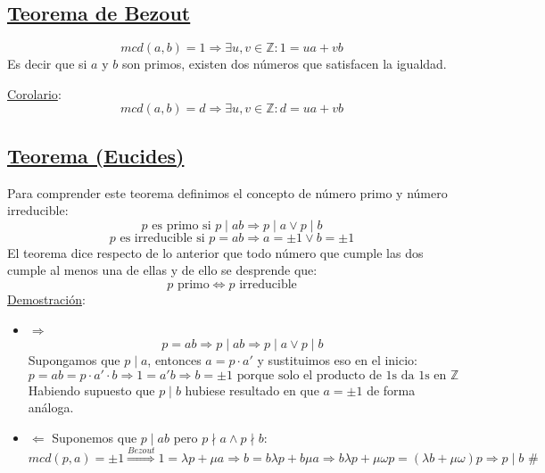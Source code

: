 \documentclass[10pt,a4paper,openright]{book}
\begin{document}
\subsection*{\underline{Teorema de Bezout}}
$$mcd(a,b)=1\Rightarrow \exists u,v\in \mathbb Z : 1=ua+vb$$
Es decir que si $a$ y $b$ son primos, existen dos números que satisfacen la igualdad.\par
\underline{Corolario}:
$$mcd(a,b)=d\Rightarrow \exists u,v \in \mathbb Z: d=ua+vb$$

\subsection*{\underline{Teorema (Eucides)}}
Para comprender este teorema definimos el concepto de número primo y número irreducible:
$$p\mbox{ es primo si }p\mid ab\Rightarrow p\mid a \vee p\mid b$$
$$p\mbox{ es irreducible si } p=ab\Rightarrow a=\pm 1 \vee b=\pm 1$$
El teorema dice respecto de lo anterior que todo número que cumple las dos cumple al menos una de ellas y de ello se desprende que:
$$p\mbox{ primo}\Leftrightarrow p\mbox{ irreducible}$$
\underline{Demostración}:
\begin{itemize}
\item $\Rightarrow$
$$p=ab\Rightarrow p\mid ab\Rightarrow p\mid a \vee p\mid b$$
Supongamos que $p\mid a$, entonces $a=p\cdot a'$ y sustituimos eso en el inicio:
$$p=ab=p\cdot a'\cdot b\Rightarrow 1=a'b\Rightarrow b=\pm 1\mbox{ porque solo el producto de 1s da 1s en }\mathbb Z $$
Habiendo supuesto que $p\mid b$ hubiese resultado en que $a=\pm 1$ de forma análoga.

\item $\Leftarrow$
Suponemos que $p\mid ab$ pero $p\nmid a\wedge p\nmid b$:
$$mcd(p,a)=\pm 1\stackrel{Bezout}{\Rightarrow} 1=\lambda p+ \mu a\Rightarrow b=b\lambda p+ b\mu a \Rightarrow b \lambda p+ \mu \omega p=(\lambda b+ \mu \omega)p\Rightarrow p\mid b \mbox{ \#}$$
\end{itemize}
\end{document}
